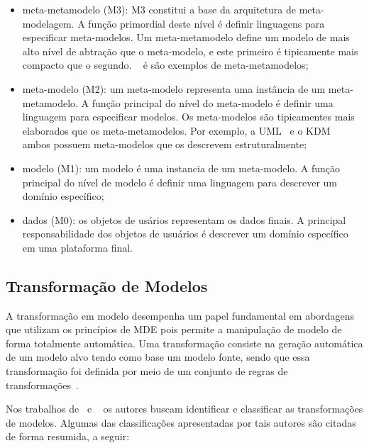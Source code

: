 \begin{itemize}
	\item meta-metamodelo (M3): M3 constitui a base da arquitetura de meta-modelagem. A função primordial deste nível é definir linguagens para especificar meta-modelos. Um meta-metamodelo define um modelo de mais alto nível de abtração que o meta-modelo, e este primeiro é tipicamente mais compacto que o segundo. ~\cite{MOF} é \cite{EMF} são exemplos de meta-metamodelos;
	\item meta-modelo (M2): um meta-modelo representa uma instância de um meta-metamodelo. A função principal do nível do meta-modelo é definir uma linguagem para especificar modelos. Os meta-modelos são tipicamentes mais elaborados que os meta-metamodelos. Por exemplo, a UML~\cite{UML:OMG} e o KDM~\cite{KDM:ISO} ambos possuem meta-modelos que os descrevem estruturalmente;
	\item modelo (M1): um modelo é uma instancia de um meta-modelo. A função principal do nível de modelo é definir uma linguagem para descrever um domínio específico;
	\item dados (M0): os objetos de usários representam os dados finais. A principal responsabilidade dos objetos de usuários é descrever um domínio específico em uma plataforma final.
\end{itemize}

\subsection{Transformação de Modelos}\label{sec:transformacoes_de_modelos}

A transformação em modelo desempenha um papel fundamental em abordagens que utilizam os princípios de MDE pois permite a manipulação de modelo de forma totalmente automática. Uma transformação consiste na geração automática de um modelo alvo tendo como base um modelo fonte, sendo que essa transformação foi definida por meio de um conjunto de regras de transformações~\cite{Mens_2006}. 

Nos trabalhos de~ e ~ os autores buscam identificar e classificar as transformações de modelos. Algumas das classificações apresentadas por tais autores são citadas de forma resumida, a seguir:

